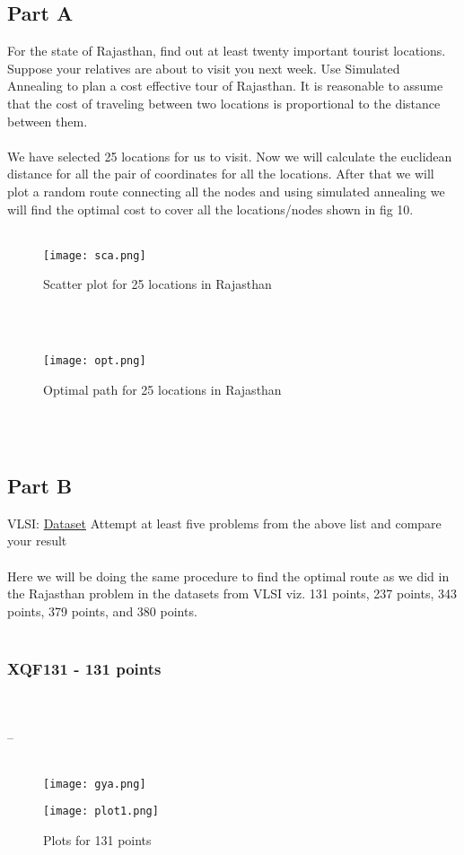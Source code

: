 \documentclass[conference]{IEEEtran}
\begin{document}
\subsection{Part A}
 For the state of Rajasthan, find out at least twenty important tourist locations.  Suppose your relatives are about to visit you next week.  Use Simulated Annealing to plan a cost effective tour of Rajasthan.  It is reasonable to assume that the cost of traveling between two locations is proportional to the distance between them.
\\
\\
We have selected 25 locations for us to visit. Now we will calculate the euclidean distance for all the pair of coordinates for all the locations. After that we will plot a random route connecting all the nodes and using simulated annealing we will find the optimal cost to cover all the locations/nodes shown in fig 10.\cite{}
\\
\\
\begin{figure}[htbp]
\centerline{\texttt{[image: sca.png]}}
\caption{Scatter plot for 25 locations in Rajasthan}
\label{fig}
\end{figure}
\\
\\

\begin{figure}[htbp]
\centerline{\texttt{[image: opt.png]}}
\caption{Optimal path for 25 locations in Rajasthan}
\label{fig}
\end{figure}
\\
\\


\subsection{Part B}
VLSI: \href{http://www.math.uwaterloo.ca/tsp/vlsi/index.html}{Dataset}
Attempt at least five problems from the above list and compare
your result
\\
\\

Here we will be doing the same procedure to find the optimal route as we did in the Rajasthan problem in the datasets from VLSI viz. 131 points, 237 points, 343 points, 379 points, and 380 points.
\\
\\
\subsubsection{XQF131 - 131 points}
\\
\\
--
\\
\\
\begin{figure}[htbp]
\centerline{\texttt{[image: gya.png]}}

\label{fig}
\end{figure}
\begin{figure}[htbp]
\centerline{\texttt{[image: plot1.png]}}
\caption{Plots for 131 points}
\label{}
\end{figure}
\\
\\
\end{document}
